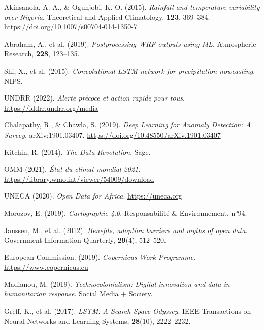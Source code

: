 \documentclass[a4paper,12pt,openany]{report}
\begin{document}
\begin{thebibliography}{99}
	Akinsanola, A. A., \& Ogunjobi, K. O. (2015).
	\textit{Rainfall and temperature variability over Nigeria}.
	Theoretical and Applied Climatology, \textbf{123}, 369–384. \url{https://doi.org/10.1007/s00704-014-1350-7}
	
	Abraham, A., et al. (2019).
	\textit{Postprocessing WRF outputs using ML}.
	Atmospheric Research, \textbf{228}, 123–135.
	
	Shi, X., et al. (2015).
	\textit{Convolutional LSTM network for precipitation nowcasting}.
	NIPS.
	
	UNDRR (2022).
	\textit{Alerte précoce et action rapide pour tous}.
	\url{https://iddrr.undrr.org/media}
	
	Chalapathy, R., \& Chawla, S. (2019).
	\textit{Deep Learning for Anomaly Detection: A Survey}.
	arXiv:1901.03407. \url{https://doi.org/10.48550/arXiv.1901.03407}
	
	Kitchin, R. (2014).
	\textit{The Data Revolution}.
	Sage.
	
	OMM (2021).
	\textit{État du climat mondial 2021}.
	\url{https://library.wmo.int/viewer/54009/download}
	
	UNECA (2020).
	\textit{Open Data for Africa}.
	\url{https://uneca.org}
	
	Morozov, E. (2019).
	\textit{Cartographie 4.0}.
	Responsabilité \& Environnement, n°94.
	
	Janssen, M., et al. (2012).
	\textit{Benefits, adoption barriers and myths of open data}.
	Government Information Quarterly, \textbf{29}(4), 512–520.
	
	European Commission. (2019).
	\textit{Copernicus Work Programme}.
	\url{https://www.copernicus.eu}
	
	Madianou, M. (2019).
	\textit{Technocolonialism: Digital innovation and data in humanitarian response}.
	Social Media + Society.
	
	Greff, K., et al. (2017).
	\textit{LSTM: A Search Space Odyssey}.
	IEEE Transactions on Neural Networks and Learning Systems, \textbf{28}(10), 2222–2232.
	
\end{thebibliography}


	
\end{document}
